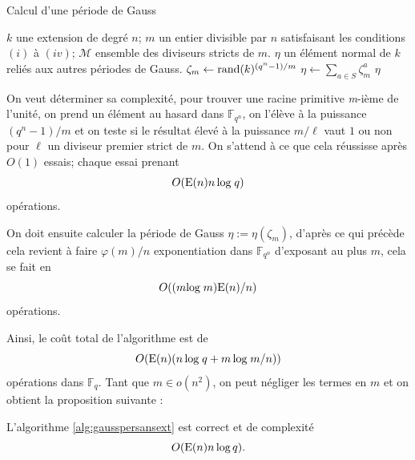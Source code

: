 \documentclass[a4paper]{article} %
\numberwithin{section}{part}
\numberwithin{equation}{section}
\newcommand\nroot[1]{\textit{#1}-ième}
\newcommand\GF[1]{\mathbb{F}_{#1}}
\newcommand\E[1]{\textup{E}(#1)}
\begin{document}
\begin{algorithm}
\caption{Calcul d'une période de Gauss}
\label{alg:gausspersansext}
\begin{algorithmic}[1]
\REQUIRE $k$ une extension de degré $n$; $m$ un entier divisible par $n$
satisfaisant les conditions $(i)$ à $(iv)$; $\mathcal{M}$ ensemble des diviseurs
stricts de $m$.
\ENSURE $\eta$ un élément normal de $k$ reliés aux autres périodes de Gauss.
\bigskip
\REPEAT
    \STATE $\zeta_m \leftarrow \textup{rand}(k)^{(q^n - 1)/m}$
\STATE $\eta \leftarrow \sum_{a\in S}{\zeta_m^a}$
\RETURN $\eta$
\end{algorithmic}
\end{algorithm}
On veut déterminer sa complexité, pour trouver une racine primitive 
\nroot{m} de l'unité, on prend un élément au hasard dans $\GF{q^n}$, on l'élève 
à la puissance $(q^n - 1)/m$ et on teste si le résultat élevé à la puissance 
$m/\ell$ vaut $1$ ou non pour $\ell$ un diviseur premier strict de $m$. On 
s'attend à ce que cela réussisse après $O(1)$ essais; chaque essai prenant 
\begin{equation}
O(\E{n}n\,\textup{log\;}q)
\end{equation}
opérations.\par
On doit ensuite calculer la période de Gauss $\eta := \eta(\zeta_m)$,
d'après ce qui précède cela revient à faire $\varphi(m)/n$ exponentiation dans
$\GF{q^n}$ d'exposant au plus $m$, cela se fait en 
\begin{equation}
O((m\textup{log\;}m)\E{n}/n) 
\end{equation}
opérations.\par
Ainsi, le coût total de l'algorithme est de 
\begin{equation}
O(\E{n}(n\,\textup{log\;}q + m\,\textup{log\;}m/n))
\end{equation}
opérations dans $\GF{q}$. Tant que $m\in o(n^2)$, on 
peut négliger les termes en $m$ et on obtient la proposition suivante :
\begin{prop}
\label{prop:algsansext}
L'algorithme \ref{alg:gausspersansext} est correct et de complexité
\begin{equation}
O(\E{n}n\,\textup{log\,}q).
\end{equation}
\end{prop}
\end{document}
